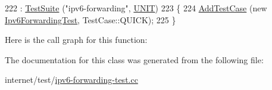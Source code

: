 \begin{DoxyCode}
222                              : \hyperlink{classns3_1_1TestSuite_a904b0c40583b744d30908aeb94636d1a}{TestSuite} (\textcolor{stringliteral}{"ipv6-forwarding"}, \hyperlink{classns3_1_1TestSuite_a1ebfcab34ec8161e085e8e3a1855eae0a3885375a3787abf60431f8454b3cadbd}{UNIT})
223   \{
224     \hyperlink{classns3_1_1TestCase_a3718088e3eefd5d6454569d2e0ddd835}{AddTestCase} (\textcolor{keyword}{new} \hyperlink{classIpv6ForwardingTest}{Ipv6ForwardingTest}, TestCase::QUICK);
225   \}
\end{DoxyCode}


Here is the call graph for this function\+:




The documentation for this class was generated from the following file\+:\begin{DoxyCompactItemize}
\item 
internet/test/\hyperlink{ipv6-forwarding-test_8cc}{ipv6-\/forwarding-\/test.\+cc}\end{DoxyCompactItemize}
